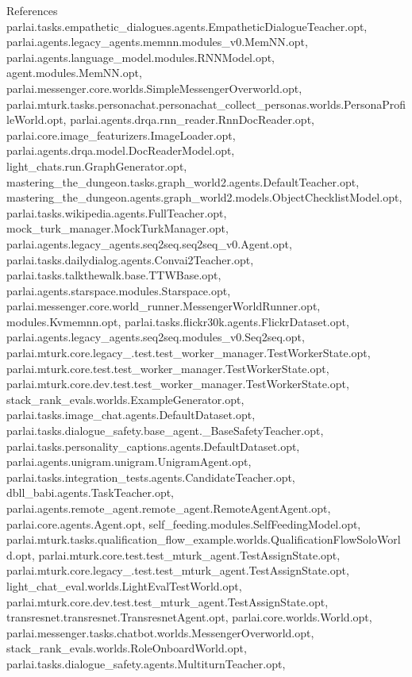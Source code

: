 References parlai.\+tasks.\+empathetic\+\_\+dialogues.\+agents.\+Empathetic\+Dialogue\+Teacher.\+opt, parlai.\+agents.\+legacy\+\_\+agents.\+memnn.\+modules\+\_\+v0.\+Mem\+N\+N.\+opt, parlai.\+agents.\+language\+\_\+model.\+modules.\+R\+N\+N\+Model.\+opt, agent.\+modules.\+Mem\+N\+N.\+opt, parlai.\+messenger.\+core.\+worlds.\+Simple\+Messenger\+Overworld.\+opt, parlai.\+mturk.\+tasks.\+personachat.\+personachat\+\_\+collect\+\_\+personas.\+worlds.\+Persona\+Profile\+World.\+opt, parlai.\+agents.\+drqa.\+rnn\+\_\+reader.\+Rnn\+Doc\+Reader.\+opt, parlai.\+core.\+image\+\_\+featurizers.\+Image\+Loader.\+opt, parlai.\+agents.\+drqa.\+model.\+Doc\+Reader\+Model.\+opt, light\+\_\+chats.\+run.\+Graph\+Generator.\+opt, mastering\+\_\+the\+\_\+dungeon.\+tasks.\+graph\+\_\+world2.\+agents.\+Default\+Teacher.\+opt, mastering\+\_\+the\+\_\+dungeon.\+agents.\+graph\+\_\+world2.\+models.\+Object\+Checklist\+Model.\+opt, parlai.\+tasks.\+wikipedia.\+agents.\+Full\+Teacher.\+opt, mock\+\_\+turk\+\_\+manager.\+Mock\+Turk\+Manager.\+opt, parlai.\+agents.\+legacy\+\_\+agents.\+seq2seq.\+seq2seq\+\_\+v0.\+Agent.\+opt, parlai.\+tasks.\+dailydialog.\+agents.\+Convai2\+Teacher.\+opt, parlai.\+tasks.\+talkthewalk.\+base.\+T\+T\+W\+Base.\+opt, parlai.\+agents.\+starspace.\+modules.\+Starspace.\+opt, parlai.\+messenger.\+core.\+world\+\_\+runner.\+Messenger\+World\+Runner.\+opt, modules.\+Kvmemnn.\+opt, parlai.\+tasks.\+flickr30k.\+agents.\+Flickr\+Dataset.\+opt, parlai.\+agents.\+legacy\+\_\+agents.\+seq2seq.\+modules\+\_\+v0.\+Seq2seq.\+opt, parlai.\+mturk.\+core.\+legacy\+\_.\+test.\+test\+\_\+worker\+\_\+manager.\+Test\+Worker\+State.\+opt, parlai.\+mturk.\+core.\+test.\+test\+\_\+worker\+\_\+manager.\+Test\+Worker\+State.\+opt, parlai.\+mturk.\+core.\+dev.\+test.\+test\+\_\+worker\+\_\+manager.\+Test\+Worker\+State.\+opt, stack\+\_\+rank\+\_\+evals.\+worlds.\+Example\+Generator.\+opt, parlai.\+tasks.\+image\+\_\+chat.\+agents.\+Default\+Dataset.\+opt, parlai.\+tasks.\+dialogue\+\_\+safety.\+base\+\_\+agent.\+\_\+\+Base\+Safety\+Teacher.\+opt, parlai.\+tasks.\+personality\+\_\+captions.\+agents.\+Default\+Dataset.\+opt, parlai.\+agents.\+unigram.\+unigram.\+Unigram\+Agent.\+opt, parlai.\+tasks.\+integration\+\_\+tests.\+agents.\+Candidate\+Teacher.\+opt, dbll\+\_\+babi.\+agents.\+Task\+Teacher.\+opt, parlai.\+agents.\+remote\+\_\+agent.\+remote\+\_\+agent.\+Remote\+Agent\+Agent.\+opt, parlai.\+core.\+agents.\+Agent.\+opt, self\+\_\+feeding.\+modules.\+Self\+Feeding\+Model.\+opt, parlai.\+mturk.\+tasks.\+qualification\+\_\+flow\+\_\+example.\+worlds.\+Qualification\+Flow\+Solo\+World.\+opt, parlai.\+mturk.\+core.\+test.\+test\+\_\+mturk\+\_\+agent.\+Test\+Assign\+State.\+opt, parlai.\+mturk.\+core.\+legacy\+\_.\+test.\+test\+\_\+mturk\+\_\+agent.\+Test\+Assign\+State.\+opt, light\+\_\+chat\+\_\+eval.\+worlds.\+Light\+Eval\+Test\+World.\+opt, parlai.\+mturk.\+core.\+dev.\+test.\+test\+\_\+mturk\+\_\+agent.\+Test\+Assign\+State.\+opt, transresnet.\+transresnet.\+Transresnet\+Agent.\+opt, parlai.\+core.\+worlds.\+World.\+opt, parlai.\+messenger.\+tasks.\+chatbot.\+worlds.\+Messenger\+Overworld.\+opt, stack\+\_\+rank\+\_\+evals.\+worlds.\+Role\+Onboard\+World.\+opt, parlai.\+tasks.\+dialogue\+\_\+safety.\+agents.\+Multiturn\+Teacher.\+opt, 
